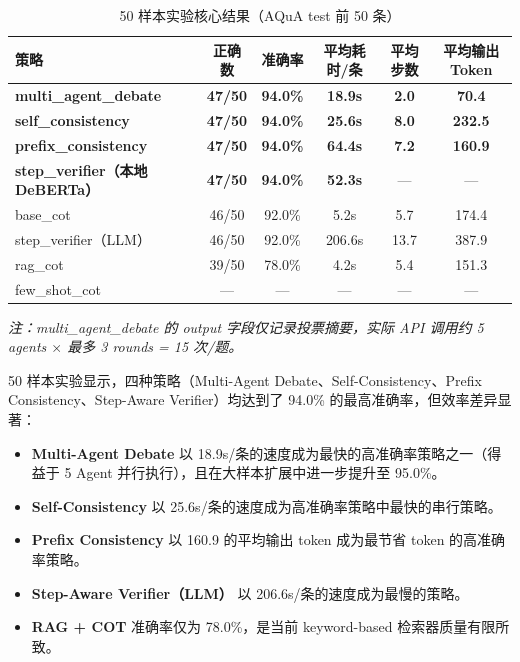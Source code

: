 \documentclass[lang=cn,a4paper,newtx]{elegantpaper}
\begin{document}
\begin{table}[htbp]
\centering
\caption{50 样本实验核心结果（AQuA test 前 50 条）}
\begin{tabular}{lccccc}
\toprule
策略 & 正确数 & 准确率 & 平均耗时/条 & 平均步数 & 平均输出 Token \\
\midrule
\textbf{multi\_agent\_debate} & \textbf{47/50} & \textbf{94.0\%} & \textbf{18.9s} & \textbf{2.0} & \textbf{70.4} \\
\textbf{self\_consistency} & \textbf{47/50} & \textbf{94.0\%} & \textbf{25.6s} & \textbf{8.0} & \textbf{232.5} \\
\textbf{prefix\_consistency} & \textbf{47/50} & \textbf{94.0\%} & \textbf{64.4s} & \textbf{7.2} & \textbf{160.9} \\
\textbf{step\_verifier（本地 DeBERTa）} & \textbf{47/50} & \textbf{94.0\%} & \textbf{52.3s} & --- & --- \\
base\_cot & 46/50 & 92.0\% & 5.2s & 5.7 & 174.4 \\
step\_verifier（LLM） & 46/50 & 92.0\% & 206.6s & 13.7 & 387.9 \\
rag\_cot & 39/50 & 78.0\% & 4.2s & 5.4 & 151.3 \\
few\_shot\_cot & --- & --- & --- & --- & --- \\
\bottomrule
\end{tabular}
\end{table}

\textit{注：multi\_agent\_debate 的 output 字段仅记录投票摘要，实际 API 调用约 5 agents $\times$ 最多 3 rounds = 15 次/题。}

50 样本实验显示，四种策略（Multi-Agent Debate、Self-Consistency、Prefix Consistency、Step-Aware Verifier）均达到了 94.0\% 的最高准确率，但效率差异显著：

\begin{itemize}
  \item \textbf{Multi-Agent Debate} 以 18.9s/条的速度成为最快的高准确率策略之一（得益于 5 Agent 并行执行），且在大样本扩展中进一步提升至 95.0\%。
  \item \textbf{Self-Consistency} 以 25.6s/条的速度成为高准确率策略中最快的串行策略。
  \item \textbf{Prefix Consistency} 以 160.9 的平均输出 token 成为最节省 token 的高准确率策略。
  \item \textbf{Step-Aware Verifier（LLM）} 以 206.6s/条的速度成为最慢的策略。
  \item \textbf{RAG + COT} 准确率仅为 78.0\%，是当前 keyword-based 检索器质量有限所致。
\end{itemize}
\end{document}
